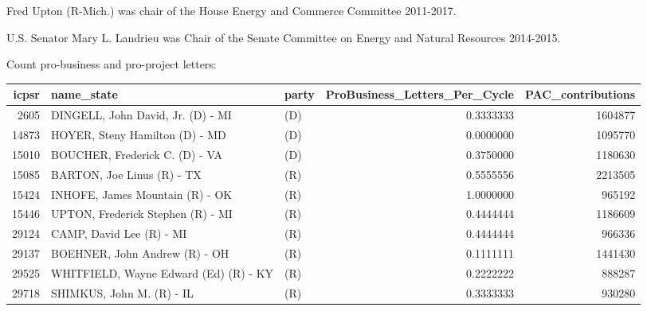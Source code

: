 \documentclass[]{article}
\newenvironment{Shaded}{\begin{snugshade}}{\end{snugshade}}
\newcommand{\KeywordTok}[1]{\textcolor[rgb]{0.13,0.29,0.53}{\textbf{#1}}}
\newcommand{\DataTypeTok}[1]{\textcolor[rgb]{0.13,0.29,0.53}{#1}}
\newcommand{\DecValTok}[1]{\textcolor[rgb]{0.00,0.00,0.81}{#1}}
\newcommand{\StringTok}[1]{\textcolor[rgb]{0.31,0.60,0.02}{#1}}
\newcommand{\CommentTok}[1]{\textcolor[rgb]{0.56,0.35,0.01}{\textit{#1}}}
\newcommand{\OtherTok}[1]{\textcolor[rgb]{0.56,0.35,0.01}{#1}}
\newcommand{\OperatorTok}[1]{\textcolor[rgb]{0.81,0.36,0.00}{\textbf{#1}}}
\newcommand{\NormalTok}[1]{#1}
\begin{document}
Fred Upton (R-Mich.) was chair of the House Energy and Commerce
Committee 2011-2017.

U.S. Senator Mary L. Landrieu was Chair of the Senate Committee on
Energy and Natural Resources 2014-2015.

Count pro-business and pro-project letters:

\begin{Shaded}
\end{Shaded}

\begin{longtable}[]{@{}rllrr@{}}
\toprule
icpsr & name\_state & party & ProBusiness\_Letters\_Per\_Cycle &
PAC\_contributions\tabularnewline
\midrule
\endhead
2605 & DINGELL, John David, Jr. (D) - MI & (D) & 0.3333333 &
1604877\tabularnewline
14873 & HOYER, Steny Hamilton (D) - MD & (D) & 0.0000000 &
1095770\tabularnewline
15010 & BOUCHER, Frederick C. (D) - VA & (D) & 0.3750000 &
1180630\tabularnewline
15085 & BARTON, Joe Linus (R) - TX & (R) & 0.5555556 &
2213505\tabularnewline
15424 & INHOFE, James Mountain (R) - OK & (R) & 1.0000000 &
965192\tabularnewline
15446 & UPTON, Frederick Stephen (R) - MI & (R) & 0.4444444 &
1186609\tabularnewline
29124 & CAMP, David Lee (R) - MI & (R) & 0.4444444 &
966336\tabularnewline
29137 & BOEHNER, John Andrew (R) - OH & (R) & 0.1111111 &
1441430\tabularnewline
29525 & WHITFIELD, Wayne Edward (Ed) (R) - KY & (R) & 0.2222222 &
888287\tabularnewline
29718 & SHIMKUS, John M. (R) - IL & (R) & 0.3333333 &
930280\tabularnewline
\bottomrule
\end{longtable}
\end{document}
